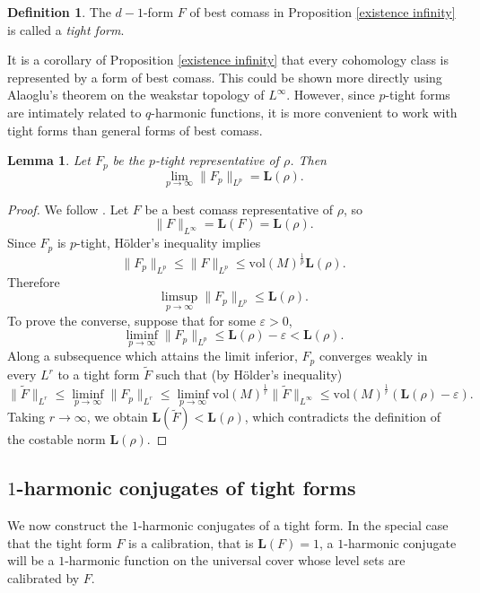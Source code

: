 \documentclass[reqno,11pt]{amsart}
\newcommand{\vol}{\mathrm{vol}}
\newcommand{\Comass}{\mathbf L}
\newcommand{\dfn}[1]{\emph{#1}\index{#1}}
\newtheorem{lemma}[theorem]{Lemma}
\theoremstyle{definition}
\newtheorem{definition}[theorem]{Definition}
\numberwithin{equation}{section}
\begin{document}
\begin{definition}
The $d - 1$-form $F$ of best comass in Proposition \ref{existence infinity} is called a \dfn{tight form}.
\end{definition}

It is a corollary of Proposition \ref{existence infinity} that every cohomology class is represented by a form of best comass.
This could be shown more directly using Alaoglu's theorem on the weakstar topology of $L^\infty$.
However, since $p$-tight forms are intimately related to $q$-harmonic functions, it is more convenient to work with tight forms than general forms of best comass.

\begin{lemma}\label{p tights approximate L}
Let $F_p$ be the $p$-tight representative of $\rho$. Then 
$$\lim_{p \to \infty} \|F_p\|_{L^p} = \Comass(\rho).$$
\end{lemma}
\begin{proof}
We follow \cite[Lemma 2.7]{daskalopoulos2020transverse}.
Let $F$ be a best comass representative of $\rho$, so
$$\|F\|_{L^\infty} = \Comass(F) = \Comass(\rho).$$
Since $F_p$ is $p$-tight, H\"older's inequality implies 
$$\|F_p\|_{L^p} \leq \|F\|_{L^p} \leq \vol(M)^{\frac{1}{p}} \Comass(\rho).$$
Therefore 
$$\limsup_{p \to \infty} \|F_p\|_{L^p} \leq \Comass(\rho).$$
To prove the converse, suppose that for some $\varepsilon > 0$,
$$\liminf_{p \to \infty} \|F_p\|_{L^p} \leq \Comass(\rho) - \varepsilon < \Comass(\rho).$$
Along a subsequence which attains the limit inferior, $F_p$ converges weakly in every $L^r$ to a tight form $\tilde F$ such that (by H\"older's inequality)
$$\|\tilde F\|_{L^r} \leq \liminf_{p \to \infty} \|F_p\|_{L^r} \leq \liminf_{p \to \infty} \vol(M)^{\frac{1}{r}} \|\tilde F\|_{L^\infty} \leq \vol(M)^{\frac{1}{r}} (\Comass(\rho) - \varepsilon).$$
Taking $r \to \infty$, we obtain $\Comass(\tilde F) < \Comass(\rho)$, which contradicts the definition of the costable norm $\Comass(\rho)$.
\end{proof}


\subsection{\texorpdfstring{$1$-harmonic conjugates of tight forms}{One-harmonic conjugates of tight forms}}
We now construct the $1$-harmonic conjugates of a tight form.
In the special case that the tight form $F$ is a calibration, that is $\Comass(F) = 1$, a $1$-harmonic conjugate will be a $1$-harmonic function on the universal cover whose level sets are calibrated by $F$.
\end{document}
